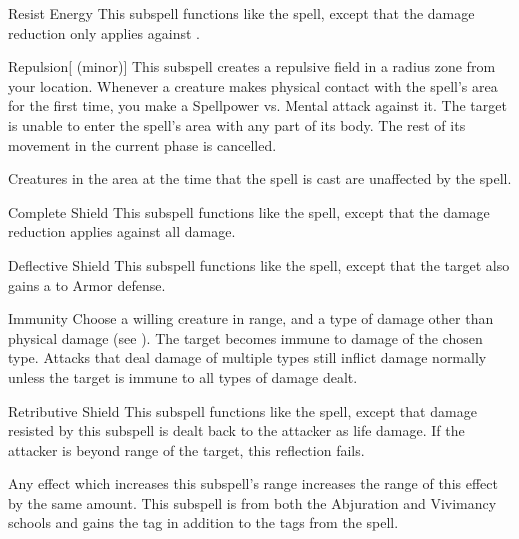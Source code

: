 \begin{ability}[\nth{1}]{Resist Energy}
This subspell functions like the  spell, except that the damage reduction only applies against .
\end{ability}
\vspace{0.25em}


\begin{ability}[\nth{2}]{Repulsion}[ (minor)]
This subspell creates a repulsive field in a \areamed radius zone from your location.
Whenever a creature makes physical contact with the spell's area for the first time, you make a Spellpower vs. Mental attack against it.
\hit The target is unable to enter the spell's area with any part of its body.
The rest of its movement in the current phase is cancelled.

Creatures in the area at the time that the spell is cast are unaffected by the spell.
\end{ability}
\vspace{0.25em}


\begin{ability}[\nth{3}]{Complete Shield}
This subspell functions like the  spell, except that the damage reduction applies against all damage.
\end{ability}
\vspace{0.25em}


\begin{ability}[\nth{4}]{Deflective Shield}
This subspell functions like the  spell, except that the target also gains a   to Armor defense.
\end{ability}
\vspace{0.25em}


\begin{ability}[\nth{4}]{Immunity}
Choose a willing creature in \rngclose range, and a type of damage other than physical damage (see ).
The target becomes immune to damage of the chosen type.
Attacks that deal damage of multiple types still inflict damage normally unless the target is immune to all types of damage dealt.
\end{ability}
\vspace{0.25em}


\begin{ability}[\nth{4}]{Retributive Shield}
This subspell functions like the  spell, except that damage resisted by this subspell is dealt back to the attacker as life damage.
If the attacker is beyond \rngclose range of the target, this reflection fails.

Any effect which increases this subspell's range increases the range of this effect by the same amount.
This subspell is from both the Abjuration and Vivimancy schools and gains the  tag in addition to the tags from the  spell.
\end{ability}
\vspace{0.25em}


